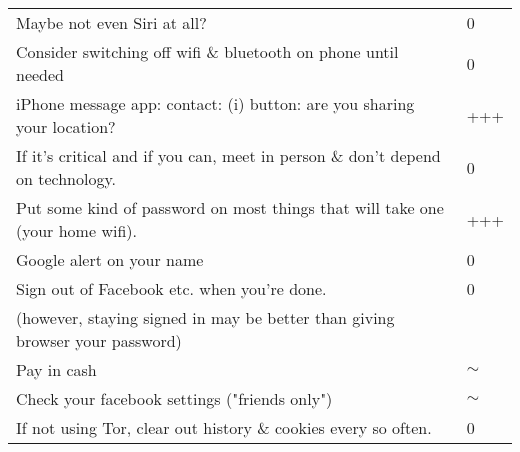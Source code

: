 \documentclass{tufte-handout}
\begin{document}
\begin{tabular}{p{5in}l}
Maybe not even Siri at all? & 0 \\

Consider switching off wifi \& bluetooth on phone until needed & 0 \\

iPhone message app: contact: (i) button: are you sharing your location? & +++ \\

If it's critical and if you can, meet in person \& don't depend on technology. & 0 \\

Put some kind of password on most things that will take one (your home wifi). & +++ \\

Google alert on your name & 0 \\

Sign out of Facebook etc. when you're done. & 0 \\

\qquad \small(however, staying signed in may be better than giving browser your password) \\

Pay in cash & $\sim$ \\

Check your facebook settings ("friends only") & $\sim$ \\

If not using Tor, clear out history \& cookies every so often. & 0 \\



\end{tabular}
\end{document}
